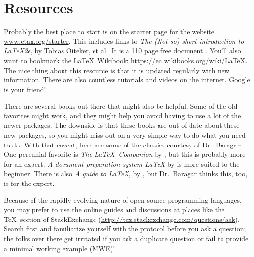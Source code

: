 \section{Resources}

Probably the best place to start is on the starter page for the website \url{www.ctan.org/starter}. This includes links to {\it The (Not so) short introduction to
\LaTeX2$\epsilon$}, by Tobias Oiteker, et al.\ It is a 110 page free
document \citep{oetiker2015notsoshort}. You'll also want to bookmark the \LaTeX\ Wikibook: \url{https://en.wikibooks.org/wiki/LaTeX}. The nice thing about this resource is that it is updated regularly with new information. There are also countless tutorials and videos on the internet. Google is your friend!

There are several books out there that might also be helpful. Some of the old favorites might work, and they might help you avoid having to use a lot of the newer packages. The downside is that these books are out of date about these new packages, so you might miss out on a very simple way to do what you need to do. With that caveat, here are some of the classics courtesy of Dr.\ Baragar: One perennial favorite is {\it The \LaTeX\ Companion} by \citet{goossens1994latex}, but this is probably more for an expert. {\it A document preparation system \LaTeX} by \citet{lamport1986document} is more suited to the beginner. There is also {\it A guide to \LaTeX}, by \citet{kopka2004guide}, but Dr.\ Baragar thinks this, too, is for the expert. 

Because of the rapidly evolving nature of open source programming languages, you may prefer to use the online guides and discussions at places like the \TeX\ section of StackExchange (\url{http://tex.stackexchange.com/questions/ask}). Search first and familiarize yourself with the protocol before you ask a question; the folks over there get irritated if you ask a duplicate question or fail to provide a minimal working example (MWE)!
